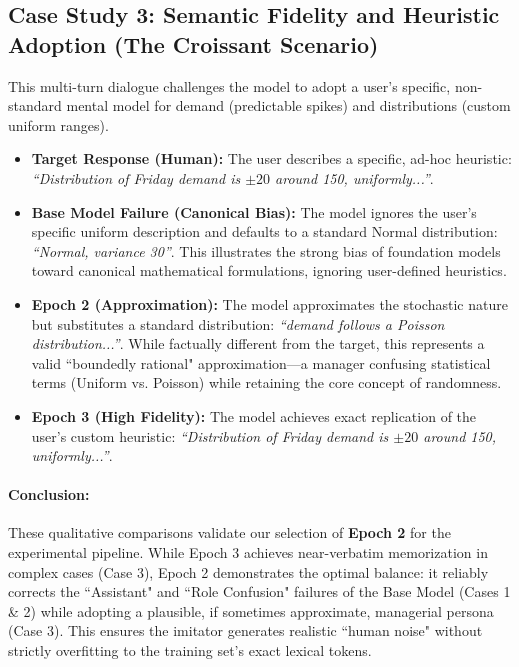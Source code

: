         \subsection*{Case Study 3: Semantic Fidelity and Heuristic Adoption (The Croissant Scenario)}\label{app:case_croissant}
        This multi-turn dialogue challenges the model to adopt a user's specific, non-standard mental model for demand (predictable spikes) and distributions (custom uniform ranges).
        \begin{itemize}
            \item \textbf{Target Response (Human):} The user describes a specific, ad-hoc heuristic: \emph{``Distribution of Friday demand is $\pm20$ around 150, uniformly...''}. 
            \item \textbf{Base Model Failure (Canonical Bias):} The model ignores the user's specific uniform description and defaults to a standard Normal distribution: \emph{``Normal, variance 30''}. This illustrates the strong bias of foundation models toward canonical mathematical formulations, ignoring user-defined heuristics.
            \item \textbf{Epoch 2 (Approximation):} The model approximates the stochastic nature but substitutes a standard distribution: \emph{``demand follows a Poisson distribution...''}. While factually different from the target, this represents a valid ``boundedly rational" approximation—a manager confusing statistical terms (Uniform vs. Poisson) while retaining the core concept of randomness. 
            \item \textbf{Epoch 3 (High Fidelity):} The model achieves exact replication of the user's custom heuristic: \emph{``Distribution of Friday demand is $\pm20$ around 150, uniformly...''}.
        \end{itemize}
        
        \paragraph{Conclusion:}
        These qualitative comparisons validate our selection of \textbf{Epoch 2} for the experimental pipeline. While Epoch 3 achieves near-verbatim memorization in complex cases (Case 3), Epoch 2 demonstrates the optimal balance: it reliably corrects the ``Assistant" and ``Role Confusion" failures of the Base Model (Cases 1 \& 2) while adopting a plausible, if sometimes approximate, managerial persona (Case 3). This ensures the imitator generates realistic ``human noise" without strictly overfitting to the training set's exact lexical tokens.